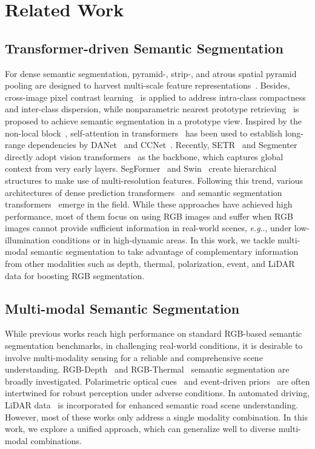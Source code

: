\documentclass[journal]{IEEEtran}
\makeatletter
\DeclareRobustCommand\onedot{\futurelet\@let@token\@onedot}
\def\@onedot{\ifx\@let@token.\else.\null\fi\xspace}
\def\eg{\emph{e.g}\onedot} \def\Eg{\emph{E.g}\onedot}
\makeatother
\begin{document}
\section{Related Work}
\subsection{Transformer-driven Semantic Segmentation}
For dense semantic segmentation, pyramid-, strip-, and atrous spatial pyramid pooling are designed to harvest multi-scale feature representations~\cite{chen2017deeplab,zhao2017pspnet}. 
Besides, cross-image pixel contrast learning~\cite{wang2021exploring_contrast} is applied to address intra-class compactness and inter-class dispersion, while nonparametric nearest prototype retrieving~\cite{zhou2022rethinking} is proposed to achieve semantic segmentation in a prototype view.
Inspired by the non-local block~\cite{wang2018nonlocal}, self-attention in transformers~\cite{vaswani2017attention} has been used to establish long-range dependencies by DANet~\cite{fu2019danet}
and CCNet~\cite{huang2019ccnet}.
Recently, SETR~\cite{zheng2021setr} and Segmenter~\cite{strudel2021segmenter} directly adopt vision transformers~\cite{dosovitskiy2021vit,touvron2021deit} as the backbone, which {captures} global context from very early layers. 
SegFormer~\cite{xie2021segformer} and Swin~\cite{liu2021swin} create hierarchical structures to make use of multi-resolution features.
Following this trend, various architectures of dense prediction transformers~\cite{wang2021pvt,yuan2021hrformer} and semantic segmentation transformers~\cite{zhang2022early_region_proxy,lin2022structtoken} emerge in the field.
While these approaches have achieved high performance, most of them focus on using RGB images and suffer when RGB images cannot provide sufficient information in real-world scenes, \eg, under low-illumination conditions or in high-dynamic areas. 
In this work, we tackle multi-modal semantic segmentation to take advantage of complementary information from other modalities such as depth, thermal, polarization, event, and LiDAR data for boosting RGB segmentation.

\subsection{Multi-modal Semantic Segmentation}
While previous works reach high performance on standard RGB-based semantic segmentation benchmarks, in challenging real-world conditions, it is desirable to involve multi-modality sensing for a reliable and comprehensive scene understanding.
{RGB-Depth~\cite{qian2021rfbnet_gated,zhou2021canet} and RGB-Thermal~\cite{sun2019rtfnet,sun2020fuseseg,zhou2021gmnet} semantic segmentation are broadly investigated.
Polarimetric optical cues~\cite{kalra2020deep_polarization} and event-driven priors~\cite{zhang2021edcnet} are often intertwined for robust perception under adverse conditions.
In automated driving, LiDAR data~\cite{zhuang2021pmf} is incorporated for enhanced semantic road scene understanding.
However, most of these works only address a single modality combination.
In this work, we explore a unified approach, which can generalize well to diverse multi-modal combinations.}
\end{document}
